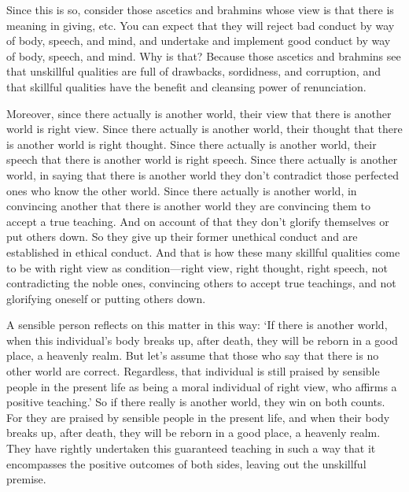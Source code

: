 \documentclass[12pt,openany]{book}%
\begin{document}
Since this is so, consider those ascetics and brahmins whose view is that there is meaning in giving, etc. You can expect that they will reject bad conduct by way of body, speech, and mind, and undertake and implement good conduct by way of body, speech, and mind. Why is that? Because those ascetics and brahmins see that unskillful qualities are full of drawbacks, sordidness, and corruption, and that skillful qualities have the benefit and cleansing power of renunciation. 

Moreover, since there actually is another world, their view that there is another world is right view. Since there actually is another world, their thought that there is another world is right thought. Since there actually is another world, their speech that there is another world is right speech. Since there actually is another world, in saying that there is another world they don’t contradict those perfected ones who know the other world. Since there actually is another world, in convincing another that there is another world they are convincing them to accept a true teaching. And on account of that they don’t glorify themselves or put others down. So they give up their former unethical conduct and are established in ethical conduct. And that is how these many skillful qualities come to be with right view as condition—right view, right thought, right speech, not contradicting the noble ones, convincing others to accept true teachings, and not glorifying oneself or putting others down. 

A sensible person reflects on this matter in this way: ‘If there is another world, when this individual’s body breaks up, after death, they will be reborn in a good place, a heavenly realm. But let’s assume that those who say that there is no other world are correct. Regardless, that individual is still praised by sensible people in the present life as being a moral individual of right view, who affirms a positive teaching.’ So if there really is another world, they win on both counts. For they are praised by sensible people in the present life, and when their body breaks up, after death, they will be reborn in a good place, a heavenly realm. They have rightly undertaken this guaranteed teaching in such a way that it encompasses the positive outcomes of both sides, leaving out the unskillful premise. 
\end{document}
